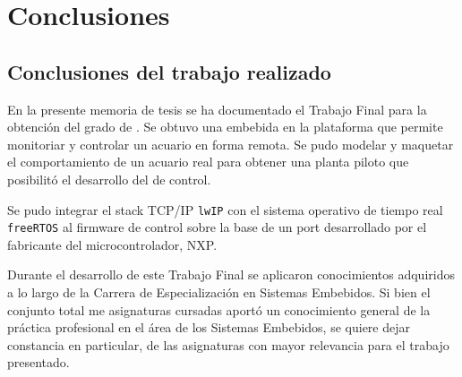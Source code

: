 
\chapter{Conclusiones} %

\label{Chapter5} %




\section{Conclusiones del trabajo realizado}

En la presente memoria de tesis se ha documentado el Trabajo Final para la obtención del grado de \degreename.  Se obtuvo una  embebida en la plataforma  que permite monitoriar y controlar un acuario en forma remota. Se pudo modelar y maquetar el comportamiento de un acuario real para obtener una planta piloto que posibilitó el desarrollo del  de control.

Se pudo integrar el stack TCP/IP \texttt{lwIP} con el sistema operativo de tiempo real \texttt{freeRTOS} al firmware de control sobre la base de un port desarrollado por el fabricante del microcontrolador, NXP.

\medskip

Durante el desarrollo de este Trabajo Final se aplicaron conocimientos adquiridos a lo largo de la Carrera de Especialización en Sistemas Embebidos.  Si bien el conjunto total me asignaturas cursadas  aportó un conocimiento general de la práctica profesional en el área de los Sistemas Embebidos, se quiere dejar constancia en particular, de las asignaturas con mayor relevancia para el trabajo presentado.

